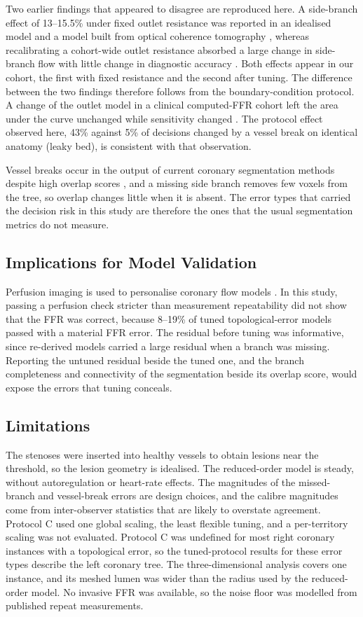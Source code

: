 \documentclass[journal]{IEEEtran}
\begin{document}
Two earlier findings that appeared to disagree are reproduced here. A side-branch effect of 13--15.5\% under fixed outlet resistance was reported in an idealised model and a model built from optical coherence tomography \cite{gamage2022}, whereas recalibrating a cohort-wide outlet resistance absorbed a large change in side-branch flow with little change in diagnostic accuracy \cite{gosling2020}. Both effects appear in our cohort, the first with fixed resistance and the second after tuning. The difference between the
two findings therefore follows from the boundary-condition protocol. A change of
the outlet model in a clinical computed-FFR cohort left the area under the curve unchanged while sensitivity
changed \cite{fossan2026}. The protocol effect observed here, 43\% against 5\% of decisions changed by a vessel break on identical anatomy (leaky bed), is consistent with that observation.

Vessel breaks occur in the output of current coronary segmentation methods despite high overlap scores \cite{bransby2026}, and a missing side branch removes few voxels from the tree, so overlap changes little when it is absent. The error types that carried the decision risk
in this study are therefore the ones that the usual segmentation metrics do not measure.

\subsection{Implications for Model Validation}
Perfusion imaging is used to personalise coronary flow models \cite{menon2024}. In this study, passing a perfusion
check stricter than measurement repeatability did not show that the FFR was correct, because 8--19\% of tuned
topological-error models passed with a material FFR error. The residual before tuning was informative, since
re-derived models carried a large residual when a branch was missing. Reporting the untuned residual beside the tuned
one, and the branch completeness and connectivity of the segmentation beside its overlap score, would expose the
errors that tuning conceals.

\subsection{Limitations}
The stenoses were inserted into healthy vessels to obtain lesions near the threshold, so the lesion geometry is
idealised. The reduced-order model is steady, without autoregulation or heart-rate effects. The magnitudes of the
missed-branch and vessel-break errors are design choices, and the calibre magnitudes come from inter-observer
statistics that are likely to overstate agreement. Protocol C used one global scaling, the least flexible tuning, and
a per-territory scaling was not evaluated. Protocol C was undefined for most right coronary instances with a
topological error, so the tuned-protocol results for these error types describe the left coronary tree. The
three-dimensional analysis covers one instance, and its meshed lumen was wider than the radius used by the
reduced-order model. No invasive FFR was available, so the noise floor was modelled from published repeat
measurements.
\end{document}
